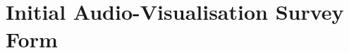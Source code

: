 \documentclass[../initial_thesis.tex]{subfiles}
\begin{document}
\chapter{Initial Audio-Visualisation Survey Form}

\end{document}
